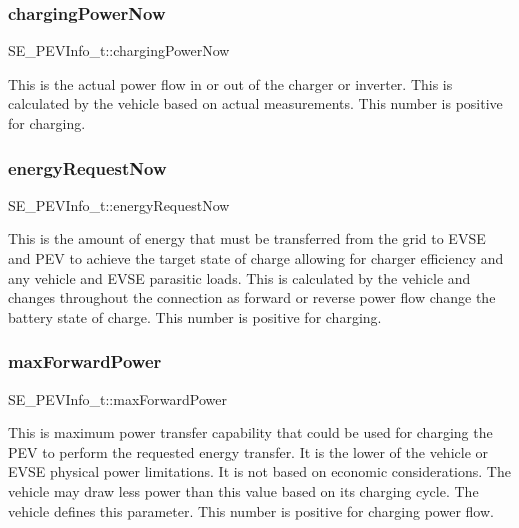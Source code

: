 \subsubsection{\texorpdfstring{charging\+Power\+Now}{chargingPowerNow}}
{\footnotesize\ttfamily S\+E\+\_\+\+P\+E\+V\+Info\+\_\+t\+::charging\+Power\+Now}

This is the actual power flow in or out of the charger or inverter. This is calculated by the vehicle based on actual measurements. This number is positive for charging. \mbox{\label{group__PEVInfo_gad47c45664492878b0b3afc247a5d5522}} 
\subsubsection{\texorpdfstring{energy\+Request\+Now}{energyRequestNow}}
{\footnotesize\ttfamily S\+E\+\_\+\+P\+E\+V\+Info\+\_\+t\+::energy\+Request\+Now}

This is the amount of energy that must be transferred from the grid to E\+V\+SE and P\+EV to achieve the target state of charge allowing for charger efficiency and any vehicle and E\+V\+SE parasitic loads. This is calculated by the vehicle and changes throughout the connection as forward or reverse power flow change the battery state of charge. This number is positive for charging. \mbox{\label{group__PEVInfo_ga7c062430150ff29489e36e8d96e0b12c}} 
\subsubsection{\texorpdfstring{max\+Forward\+Power}{maxForwardPower}}
{\footnotesize\ttfamily S\+E\+\_\+\+P\+E\+V\+Info\+\_\+t\+::max\+Forward\+Power}

This is maximum power transfer capability that could be used for charging the P\+EV to perform the requested energy transfer. It is the lower of the vehicle or E\+V\+SE physical power limitations. It is not based on economic considerations. The vehicle may draw less power than this value based on its charging cycle. The vehicle defines this parameter. This number is positive for charging power flow. \mbox{\label{group__PEVInfo_ga5f6d6597c160908cc295b6d1392e9225}} 
